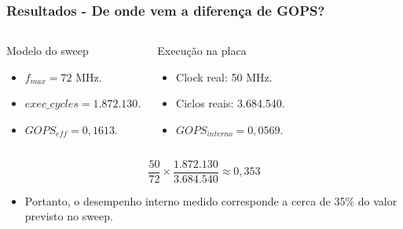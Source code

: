 \documentclass{beamer}
\begin{document}
\begin{frame}
\frametitle{Resultados - De onde vem a diferença de GOPS?}

\begin{columns}[T]
\begin{block}{Modelo do sweep}
\begin{itemize}
    \item \(f_{max}=72\) MHz.
    \item \(exec\_cycles=1.872.130\).
    \item \(GOPS_{eff}=0,1613\).
\end{itemize}
\end{block}

\begin{block}{Execução na placa}
\begin{itemize}
    \item Clock real: 50 MHz.
    \item Ciclos reais: 3.684.540.
    \item \(GOPS_{interno}=0,0569\).
\end{itemize}
\end{block}
\end{columns}

\vspace{0.2cm}
\[
    \frac{50}{72} \times \frac{1.872.130}{3.684.540}
    \approx 0,353
\]

\begin{itemize}
    \item Portanto, o desempenho interno medido corresponde a cerca de 35\% do valor previsto no sweep.
\end{itemize}

\end{frame}
\end{document}
